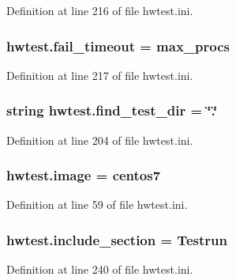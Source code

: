 Definition at line 216 of file hwtest.\-ini.

\hypertarget{namespacehwtest_a30cc5b5edc143ffd8006c27213d903f9}{
\subsubsection[{fail\-\_\-timeout}]{\setlength{\rightskip}{0pt plus 5cm}hwtest.\-fail\-\_\-timeout = max\-\_\-procs}}\label{namespacehwtest_a30cc5b5edc143ffd8006c27213d903f9}


Definition at line 217 of file hwtest.\-ini.

\hypertarget{namespacehwtest_af3c2c504aec4d3d87f8382d577e362ca}{
\subsubsection[{find\-\_\-test\-\_\-dir}]{\setlength{\rightskip}{0pt plus 5cm}string hwtest.\-find\-\_\-test\-\_\-dir = \char`\"{}.\char`\"{}}}\label{namespacehwtest_af3c2c504aec4d3d87f8382d577e362ca}


Definition at line 204 of file hwtest.\-ini.

\hypertarget{namespacehwtest_a5c55bb57a925e013f9ffd6f3e5ca99d7}{
\subsubsection[{image}]{\setlength{\rightskip}{0pt plus 5cm}hwtest.\-image = centos7}}\label{namespacehwtest_a5c55bb57a925e013f9ffd6f3e5ca99d7}


Definition at line 59 of file hwtest.\-ini.

\hypertarget{namespacehwtest_a62c9c5709c2605f42860f5424551007f}{
\subsubsection[{include\-\_\-section}]{\setlength{\rightskip}{0pt plus 5cm}hwtest.\-include\-\_\-section = Testrun}}\label{namespacehwtest_a62c9c5709c2605f42860f5424551007f}


Definition at line 240 of file hwtest.\-ini.

